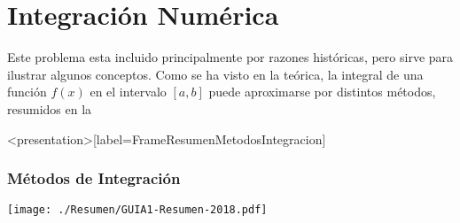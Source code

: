 \section{Integración Numérica}

Este problema esta incluido principalmente por razones históricas, 
pero sirve para ilustrar algunos conceptos. Como se ha visto en
la teórica, la integral de una función $f(x)$ en el intervalo 
$[a, b]$ puede aproximarse por distintos métodos, resumidos en la

\begin{figure}

\end{figure}

\begin{frame}<presentation>[label=FrameResumenMetodosIntegracion]
  \frametitle{Métodos de Integración}

  \texttt{[image: ./Resumen/GUIA1-Resumen-2018.pdf]}

\end{frame}
